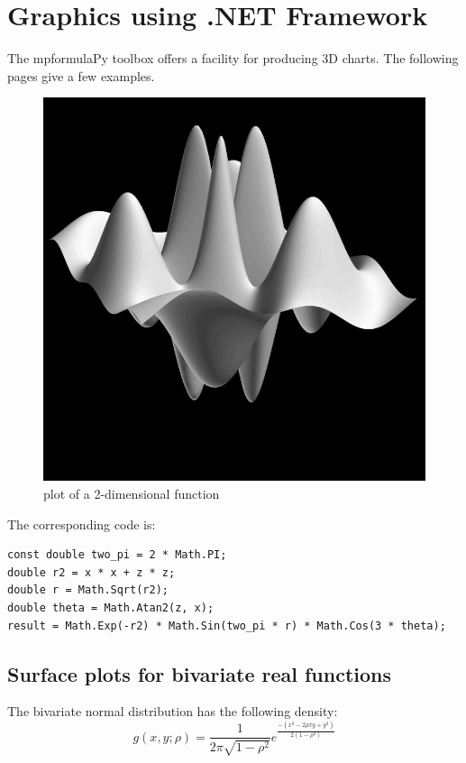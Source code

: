 \newpage
\section{Graphics using .NET Framework}
\label{Tutorial: Graphics}
The mpformulaPy toolbox offers a facility for producing 3D charts. The following pages give a few examples.

\begin{figure}[ht]
	\centering
	\includegraphics[scale=3.0]{Charts/jpg/SurfaceBlackAndWhite.jpg}
	\caption{plot of a 2-dimensional function}
	\label{Fig plot of a 2-dimensional function}
\end{figure}


The corresponding code is:
\begin{lstlisting}
const double two_pi = 2 * Math.PI;
double r2 = x * x + z * z;
double r = Math.Sqrt(r2);
double theta = Math.Atan2(z, x);
result = Math.Exp(-r2) * Math.Sin(two_pi * r) * Math.Cos(3 * theta);
\end{lstlisting}


\newpage
\subsection{Surface plots for bivariate real functions}

The bivariate normal distribution has the following density:
\begin{equation}
	g(x,y;\rho) = \frac{1}{2 \pi \sqrt{1-\rho^2}} e^{\frac{-(x^2 -2\rho x y + y^2)}{2(1-\rho^2)}}
\end{equation}


